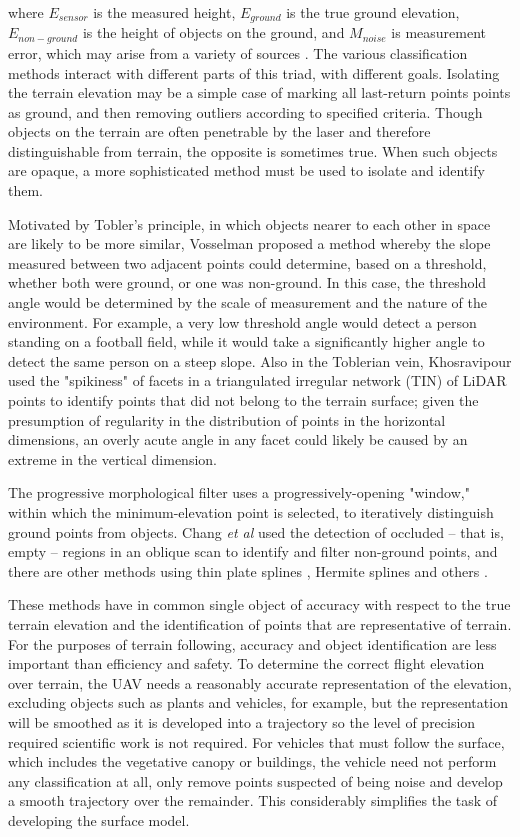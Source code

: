 \documentclass[10pt]{article}
\begin{document}
where $E_{sensor}$ is the measured height, $E_{ground}$ is the true ground elevation, $E_{non-ground}$ is the height of objects on the ground, and $M_{noise}$ is measurement error, which may arise from a variety of sources \cite{Meng2010}. The various classification methods interact with different parts of this triad, with different goals. Isolating the terrain elevation may be a simple case of marking all last-return points points as ground, and then removing outliers according to specified criteria. Though objects on the terrain are often penetrable by the laser and therefore distinguishable from terrain, the opposite is sometimes true. When such objects are opaque, a more sophisticated method must be used to isolate and identify them.

Motivated by Tobler's principle, in which objects nearer to each other in space are likely to be more similar, Vosselman \cite{Vosselman2000} proposed a method whereby the slope measured between two adjacent points could determine, based on a threshold, whether both were ground, or one was non-ground. In this case, the threshold angle would be determined by the scale of measurement and the nature of the environment. For example, a very low threshold angle would detect a person standing on a football field, while it would take a significantly higher angle to detect the same person on a steep slope. Also in the Toblerian vein, Khosravipour \cite{Khosravipour2016} used the "spikiness" of facets in a triangulated irregular network (TIN) of LiDAR points to identify points that did not belong to the terrain surface; given the presumption of regularity in the distribution of points in the horizontal dimensions, an overly acute angle in any facet could likely be caused by an extreme in the vertical dimension. 

The progressive morphological filter \cite{Zhang2003} uses a progressively-opening "window," within which the minimum-elevation point is selected, to iteratively distinguish ground points from objects. Chang \emph{et al} \cite{Chang2008} used the detection of occluded -- that is, empty -- regions in an oblique scan to identify and filter non-ground points, and there are other methods using thin plate splines \cite{Hudak2012}, Hermite splines \cite{Silvan-Cardenas2006} and others \cite{Hodgson2005,Zheng2007,Zhang2005}.

These methods have in common single object of accuracy with respect to the true terrain elevation and the identification of points that are representative of terrain. For the purposes of terrain following, accuracy and object identification are less important than efficiency and safety. To determine the correct flight elevation over terrain, the UAV needs a reasonably accurate representation of the elevation, excluding objects such as plants and vehicles, for example, but the representation will be smoothed as it is developed into a trajectory so the level of precision required scientific work is not required. For vehicles that must follow the surface, which includes the vegetative canopy or buildings, the vehicle need not perform any classification at all, only remove points suspected of being noise and develop a smooth trajectory over the remainder. This considerably simplifies the task of developing the surface model.
\end{document}
